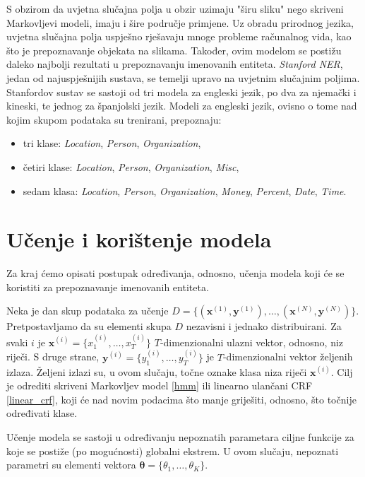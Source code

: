 \documentclass[a4paper,twoside,12pt]{memoir} %
\newcommand{\ti}[1]{\textit{#1\/}}
\begin{document}
	S obzirom da uvjetna slučajna polja u obzir uzimaju "širu sliku" nego skriveni Markovljevi modeli, imaju i šire područje primjene. Uz obradu prirodnog jezika, uvjetna slučajna polja uspješno rješavaju mnoge probleme računalnog vida, kao što je prepoznavanje objekata na slikama. Također, ovim modelom se postižu daleko najbolji rezultati u prepoznavanju imenovanih entiteta. \ti{Stanford NER}, jedan od najuspješnijih sustava, se temelji upravo na uvjetnim slučajnim poljima. Stanfordov sustav se sastoji od tri modela za engleski jezik, po dva za njemački i kineski, te jednog za španjolski jezik. Modeli za engleski jezik, ovisno o tome nad kojim skupom podataka su trenirani, prepoznaju:
	\begin{itemize}
		\item 	tri klase: \ti{Location}, \ti{Person}, \ti{Organization},
		\item	četiri klase: \ti{Location}, \ti{Person}, \ti{Organization}, \ti{Misc},
		\item 	sedam klasa: \ti{Location}, \ti{Person}, \ti{Organization}, \ti{Money}, \ti{Percent}, \ti{Date}, \ti{Time}.
	\end{itemize}

	\section{Učenje i korištenje modela}

	Za kraj ćemo opisati postupak određivanja, odnosno, učenja modela koji će se koristiti za prepoznavanje imenovanih entiteta.

	Neka je dan skup podataka za učenje $D = \{ (\mathbf{x}^{(1)}, \mathbf{y}^{(1)}), \ldots, (\mathbf{x}^{(N)}, \mathbf{y}^{(N)})\}$. Pretpostavljamo da su elementi skupa $D$ nezavisni i jednako distribuirani. Za svaki $i$ je $\mathbf{x}^{(i)} = \{x_1^{(i)}, \ldots, x_T^{(i)}\}$ $T$-dimenzionalni ulazni vektor, odnosno, niz riječi. S druge strane, $\mathbf{y}^{(i)} = \{y_1^{(i)}, \ldots, y_T^{(i)}\}$ je $T$-dimenzionalni vektor željenih izlaza. Željeni izlazi su, u ovom slučaju, točne oznake klasa niza riječi $\mathbf{x}^{(i)}$. Cilj je odrediti skriveni Markovljev model \eqref{hmm} ili linearno ulančani CRF \eqref{linear_crf}, koji će nad novim podacima što manje griješiti, odnosno, što točnije određivati klase.

	Učenje modela se sastoji u određivanju nepoznatih parametara ciljne funkcije za koje se postiže (po mogućnosti) globalni ekstrem. U ovom slučaju, nepoznati parametri su elementi vektora $\bm{\theta} = \{\theta_1, \ldots, \theta_K\}$.
\end{document}
